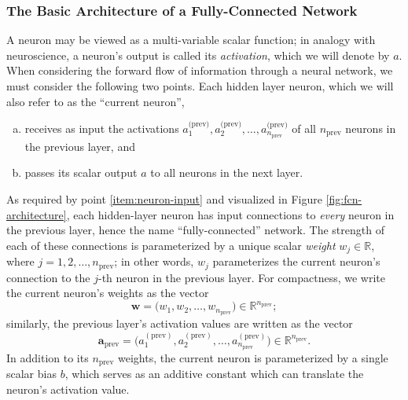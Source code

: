 \documentclass[11pt, a4paper]{article}
\renewcommand{\vec}[1]{\bm{#1}}
\newcommand{\w}{\vec{w}}
\renewcommand{\a}{\vec{a}}
\begin{document}
\subsubsection{The Basic Architecture of a Fully-Connected Network}
A neuron may be viewed as a multi-variable scalar function; in analogy with neuroscience, a neuron's output is called its \textit{activation}, which we will denote by $ a $. When considering the forward flow of information through a neural network, we must consider the following two points. Each hidden layer neuron, which we will also refer to as the ``current neuron'',
\begin{enumerate}[(a)]

    \item \label{item:neuron-input} receives as input the activations $ a^{\text{(prev)}}_{1}, a^{\text{(prev)}}_{2}, \ldots, a^{\text{(prev)}}_{n_{\text{prev}}}  $ of all $ n_{\text{prev}} $ neurons in the previous layer, and

    \item passes its scalar output $ a $ to all neurons in the next layer.

\end{enumerate}
As required by point \ref{item:neuron-input} and visualized in Figure \ref{fig:fcn-architecture}, each hidden-layer neuron has input connections to \textit{every} neuron in the previous layer, hence the name ``fully-connected'' network. The strength of each of these connections is parameterized by a unique scalar \textit{weight} $ w_{j} \in \mathbb{R} $, where $  j = 1, 2, \ldots, n_{\text{prev}} $; in other words, $ w_{j} $ parameterizes the current neuron's connection to the $ j $-th neuron in the previous layer. For compactness, we write the current neuron's weights as the vector
\begin{equation*}
    \w = \big( w_{1}, w_{2}, \ldots, w_{n_{\text{prev}}} \big) \in \mathbb{R}^{n_{\text{prev}}};
\end{equation*}
similarly, the previous layer's activation values are written as the vector
\begin{equation*}
    \a_{\text{prev}} = \Big( a_{1}^{(\text{prev})}, a_{2}^{(\text{prev})}, \ldots, a_{n_{\text{prev}}}^{(\text{prev})} \Big) \in \mathbb{R}^{n_{\text{prev}}}.
\end{equation*}
In addition to its $ n_{\text{prev}} $ weights, the current neuron is parameterized by a single scalar bias $ b $, which serves as an additive constant which can translate the neuron's activation value. 
\end{document}
